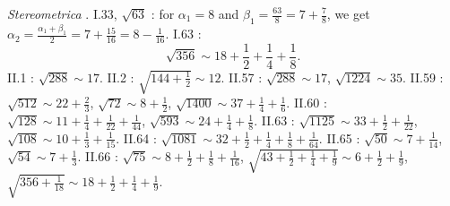 \documentclass{amsart}
\theoremstyle{definition}
\begin{document}
{\em Stereometrica} \cite{heronisV}.
I.33, $\sqrt{63}$ \cite[pp.~34--35]{heronisV}: for
$\alpha_1=8$ and $\beta_1=\frac{63}{8}=7+\frac{7}{8}$, we get
$\alpha_2 = \frac{\alpha_1+\beta_1}{2} = 7+\frac{15}{16}=8-\frac{1}{16}$. 
I.63 \cite[p.~65]{heronisV}:
\[
\sqrt{356} \sim 18 + \frac{1}{2} + \frac{1}{4}+\frac{1}{8}.
\]
II.1 \cite[p.~85]{heronisV}: $\sqrt{288} \sim 17$.
II.2 \cite[p.~87]{heronisV}: $\sqrt{144+\frac{1}{2}} \sim 12$. 
II.57 \cite[p.~139]{heronisV}: $\sqrt{288} \sim 17$,
$\sqrt{1224} \sim 35$. 
II.59 \cite[p.~143]{heronisV}: $\sqrt{512} \sim 22+\frac{2}{3}$,
$\sqrt{72} \sim 8 + \frac{1}{2}$,
$\sqrt{1400} \sim 37+\frac{1}{4}+\frac{1}{6}$.
II.60 \cite[p.~147]{heronisV}: $\sqrt{128} \sim 11+\frac{1}{4}+\frac{1}{22}+\frac{1}{44}$,
$\sqrt{593} \sim 24+\frac{1}{4}+\frac{1}{8}$. 
II.63 \cite[pp.~151--153]{heronisV}: $\sqrt{1125} \sim 33+\frac{1}{2}+\frac{1}{22}$,
$\sqrt{108} \sim 10+\frac{1}{3}+\frac{1}{15}$. 
II.64 \cite[p.~153]{heronisV}: $\sqrt{1081} \sim 32+\frac{1}{2}+\frac{1}{4}+\frac{1}{8}+\frac{1}{64}$. 
II.65 \cite[p.~155]{heronisV}: $\sqrt{50} \sim 7+\frac{1}{14}$,
$\sqrt{54} \sim 7 + \frac{1}{3}$. 
II.66 \cite[p.~157]{heronisV}: $\sqrt{75} \sim 8+\frac{1}{2}+\frac{1}{8}+\frac{1}{16}$,
$\sqrt{43+\frac{1}{2}+\frac{1}{4}+\frac{1}{9}} \sim 6+\frac{1}{2}+\frac{1}{9}$,
$\sqrt{356+\frac{1}{18}} \sim 18+\frac{1}{2}+\frac{1}{4}+\frac{1}{9}$.
\end{document}
